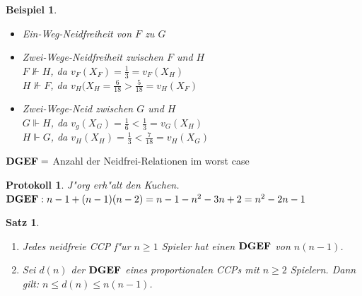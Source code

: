 \documentclass[11pt, a4paper, twoside]{article}
\newtheorem*{beispiel*}{Beispiel}
\newtheorem*{satz*}{Satz}
\newtheorem*{protokoll*}{Protokoll}
\newcommand{\DGEF}{\text{\textbf{DGEF}}}
\numberwithin{equation}{section}
\begin{document}
\begin{beispiel*}
\begin{itemize}
  \item[] Ein-Weg-Neidfreiheit von $F$ zu $G$
  \item[] Zwei-Wege-Neidfreiheit zwischen $F$ und $H$\\ $F\nVdash H$, da $v_F(X_F)=\frac{1}{3}=v_F(X_H)$\\
          $H\nVdash F$, da $v_H(X_H=\frac{6}{18}>\frac{5}{18}=v_H(X_F)$
  \item[] Zwei-Wege-Neid zwischen $G$ und $H$\\$G\Vdash H$, da $v_g(X_G)=\frac{1}{6}<\frac{1}{3}=v_G(X_H)$\\
          $H\Vdash G$, da $v_H(X_H)=\frac{1}{3}<\frac{7}{18}=v_H(X_G)$
 \end{itemize}
\end{beispiel*}
$\DGEF =$ Anzahl der Neidfrei-Relationen im worst case
\begin{protokoll*}
 J"org erh"alt den Kuchen.\\
 $\DGEF: n-1+(n-1)(n-2)=n-1-n^2-3n+2=n^2-2n-1$
\end{protokoll*}
\begin{satz*}
 \begin{enumerate}
  \item Jedes neidfreie CCP f"ur $n\geq1$ Spieler hat einen $\DGEF$ von $n(n-1)$.
  \item Sei $d(n)$ der $\DGEF$ eines proportionalen CCPs mit $n\geq2$ Spielern. Dann gilt: $n\leq d(n)\leq n(n-1)$.
 \end{enumerate}
\end{satz*}
\end{document}
